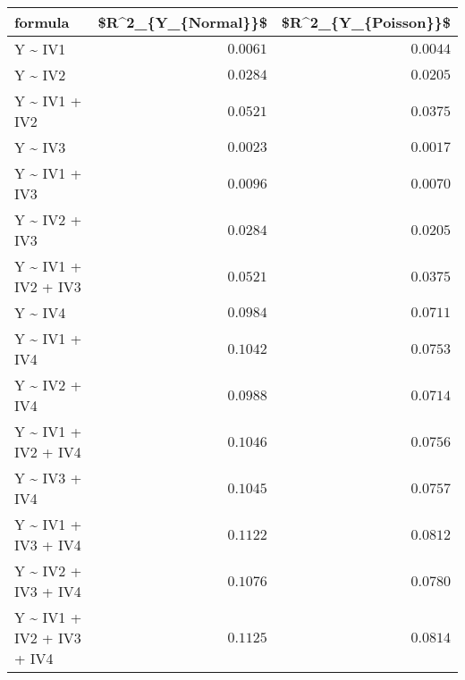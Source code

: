 \begin{longtable}{lrr}
\toprule
formula & \$R\textasciicircum{}2\_\{Y\_\{Normal\}\}\$ & \$R\textasciicircum{}2\_\{Y\_\{Poisson\}\}\$ \\ 
\midrule
Y \textasciitilde{} IV1 & $0.0061$ & $0.0044$ \\ 
Y \textasciitilde{} IV2 & $0.0284$ & $0.0205$ \\ 
Y \textasciitilde{} IV1 + IV2 & $0.0521$ & $0.0375$ \\ 
Y \textasciitilde{} IV3 & $0.0023$ & $0.0017$ \\ 
Y \textasciitilde{} IV1 + IV3 & $0.0096$ & $0.0070$ \\ 
Y \textasciitilde{} IV2 + IV3 & $0.0284$ & $0.0205$ \\ 
Y \textasciitilde{} IV1 + IV2 + IV3 & $0.0521$ & $0.0375$ \\ 
Y \textasciitilde{} IV4 & $0.0984$ & $0.0711$ \\ 
Y \textasciitilde{} IV1 + IV4 & $0.1042$ & $0.0753$ \\ 
Y \textasciitilde{} IV2 + IV4 & $0.0988$ & $0.0714$ \\ 
Y \textasciitilde{} IV1 + IV2 + IV4 & $0.1046$ & $0.0756$ \\ 
Y \textasciitilde{} IV3 + IV4 & $0.1045$ & $0.0757$ \\ 
Y \textasciitilde{} IV1 + IV3 + IV4 & $0.1122$ & $0.0812$ \\ 
Y \textasciitilde{} IV2 + IV3 + IV4 & $0.1076$ & $0.0780$ \\ 
Y \textasciitilde{} IV1 + IV2 + IV3 + IV4 & $0.1125$ & $0.0814$ \\ 
\bottomrule
\end{longtable}

